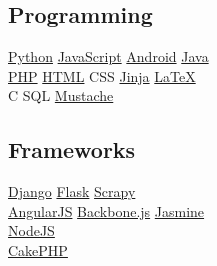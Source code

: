 \documentclass[]{joaosoares-resume}
\begin{document}
\begin{minipage}[t]{0.35\textwidth}
\subsection{Programming}
\href{http://www.python.org}{Python} \textbullet{}
\href{http://www.php.net}{JavaScript} \textbullet{}
\href{http://android.com}{Android} \textbullet{}
\href{https://www.oracle.com/java/}{Java}\\
\href{http://www.php.net}{PHP} \textbullet{}
\href{https://www.w3schools.com/html/}{HTML} \textbullet{}
CSS \textbullet{}
\href{http://jinja.pocoo.org/}{Jinja} \textbullet{}
\href{http://www.latex-project.org}{\LaTeX} \\
C \textbullet{}
SQL \textbullet{}
\href{https://mustache.github.io/}{Mustache}\\
\sectionsep

\subsection{Frameworks}
\href{https://www.djangoproject.com/}{Django} \textbullet{}
\href{http://flask.pocoo.org/}{Flask} \textbullet{}
\href{https://scrapy.org/}{Scrapy} \\
\href{https://angularjs.org}{AngularJS} \textbullet{}
\href{https://backbonejs.org/}{Backbone.js} \textbullet{}
\href{https://jasmine.github.io/}{Jasmine} \\
\href{https://nodejs.org/en/}{NodeJS} \\
\href{https://cakephp.org/}{CakePHP} \\
\sectionsep


\end{minipage}
\end{document}
